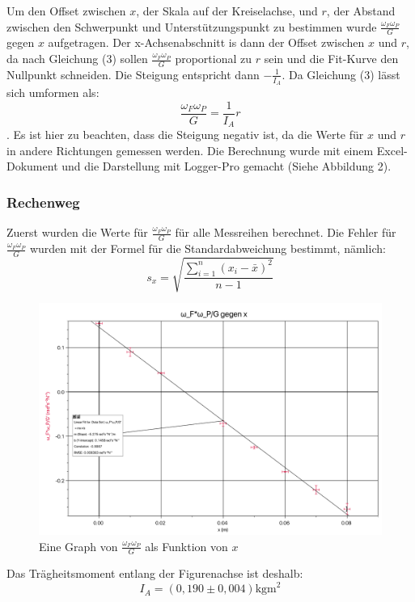 \documentclass[11pt,a4paper]{article} %
\begin{document}
Um den Offset zwischen $x$, der Skala auf der Kreiselachse, und $r$, der Abstand zwischen den Schwerpunkt und Unterstützungspunkt zu bestimmen wurde $\frac{\omega_F\omega_P}{G}$ gegen $x$ aufgetragen. Der x-Achsenabschnitt is dann der Offset zwischen $x$ und $r$, da nach Gleichung (3) sollen $\frac{\omega_F\omega_P}{G}$ proportional zu $r$ sein und die Fit-Kurve den Nullpunkt schneiden. Die Steigung entspricht dann $-\frac{1}{I_A}$. Da Gleichung (3) lässt sich umformen als:
$$ \frac{\omega_F\omega_P}{G}  = \frac{1}{I_A} r$$. Es ist hier zu beachten, dass die Steigung negativ ist, da die Werte für $x$ und $r$ in andere Richtungen gemessen werden. Die Berechnung wurde mit einem Excel-Dokument und die Darstellung mit Logger-Pro gemacht (Siehe Abbildung 2).


\begin{tcolorbox}[colback=white] 
\subsubsection{Rechenweg}
Zuerst wurden die Werte für $\frac{\omega_F\omega_P}{G}$ für alle Messreihen berechnet. Die Fehler für $\frac{\omega_F\omega_P}{G}$ wurden mit der Formel für die Standardabweichung bestimmt, nämlich:
$$s_x = \sqrt{\frac{\sum_{i=1}^{n}(x_i-\bar{x})^2}{n-1}} $$
\end{tcolorbox}

\begin{figure}
	\centering
	\includegraphics[width=\linewidth]{Abb1}
	\caption{Eine Graph von $\frac{\omega_F\omega_P}{G}$ als Funktion von $x$}
\end{figure}
Das Trägheitsmoment entlang der Figurenachse ist deshalb:
$$I_A = (0,190 \pm 0,004) \textrm{kgm}^2$$
\end{document}
